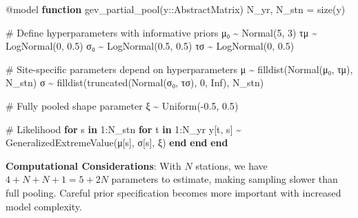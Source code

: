 \documentclass[
  letterpaper,
  DIV=11,
  numbers=noendperiod]{scrreprt}
\newenvironment{Shaded}{\begin{snugshade}}{\end{snugshade}}
\newcommand{\CommentTok}[1]{\textcolor[rgb]{0.37,0.37,0.37}{#1}}
\newcommand{\ConstantTok}[1]{\textcolor[rgb]{0.56,0.35,0.01}{#1}}
\newcommand{\ControlFlowTok}[1]{\textcolor[rgb]{0.00,0.23,0.31}{\textbf{#1}}}
\newcommand{\DataTypeTok}[1]{\textcolor[rgb]{0.68,0.00,0.00}{#1}}
\newcommand{\FloatTok}[1]{\textcolor[rgb]{0.68,0.00,0.00}{#1}}
\newcommand{\FunctionTok}[1]{\textcolor[rgb]{0.28,0.35,0.67}{#1}}
\newcommand{\KeywordTok}[1]{\textcolor[rgb]{0.00,0.23,0.31}{\textbf{#1}}}
\newcommand{\NormalTok}[1]{\textcolor[rgb]{0.00,0.23,0.31}{#1}}
\newcommand{\OperatorTok}[1]{\textcolor[rgb]{0.37,0.37,0.37}{#1}}
\newcommand{\PreprocessorTok}[1]{\textcolor[rgb]{0.68,0.00,0.00}{#1}}
\begin{document}
\begin{Shaded}
\begin{Highlighting}[]
\PreprocessorTok{@model} \KeywordTok{function} \FunctionTok{gev\_partial\_pool}\NormalTok{(y}\OperatorTok{::}\DataTypeTok{AbstractMatrix}\NormalTok{)}
\NormalTok{    N\_yr, N\_stn }\OperatorTok{=} \FunctionTok{size}\NormalTok{(y)}

    \CommentTok{\# Define hyperparameters with informative priors}
\NormalTok{    μ₀ }\OperatorTok{\textasciitilde{}} \FunctionTok{Normal}\NormalTok{(}\FloatTok{5}\NormalTok{, }\FloatTok{3}\NormalTok{)}
\NormalTok{    τμ }\OperatorTok{\textasciitilde{}} \FunctionTok{LogNormal}\NormalTok{(}\FloatTok{0}\NormalTok{, }\FloatTok{0.5}\NormalTok{)}
\NormalTok{    σ₀ }\OperatorTok{\textasciitilde{}} \FunctionTok{LogNormal}\NormalTok{(}\FloatTok{0.5}\NormalTok{, }\FloatTok{0.5}\NormalTok{)}
\NormalTok{    τσ }\OperatorTok{\textasciitilde{}} \FunctionTok{LogNormal}\NormalTok{(}\FloatTok{0}\NormalTok{, }\FloatTok{0.5}\NormalTok{)}

    \CommentTok{\# Site{-}specific parameters depend on hyperparameters}
\NormalTok{    μ }\OperatorTok{\textasciitilde{}} \FunctionTok{filldist}\NormalTok{(}\FunctionTok{Normal}\NormalTok{(μ₀, τμ), N\_stn)}
\NormalTok{    σ }\OperatorTok{\textasciitilde{}} \FunctionTok{filldist}\NormalTok{(}\FunctionTok{truncated}\NormalTok{(}\FunctionTok{Normal}\NormalTok{(σ₀, τσ), }\FloatTok{0}\NormalTok{, }\ConstantTok{Inf}\NormalTok{), N\_stn)}

    \CommentTok{\# Fully pooled shape parameter}
\NormalTok{    ξ }\OperatorTok{\textasciitilde{}} \FunctionTok{Uniform}\NormalTok{(}\OperatorTok{{-}}\FloatTok{0.5}\NormalTok{, }\FloatTok{0.5}\NormalTok{)}

    \CommentTok{\# Likelihood}
    \ControlFlowTok{for}\NormalTok{ s }\KeywordTok{in} \FloatTok{1}\OperatorTok{:}\NormalTok{N\_stn}
        \ControlFlowTok{for}\NormalTok{ t }\KeywordTok{in} \FloatTok{1}\OperatorTok{:}\NormalTok{N\_yr}
\NormalTok{            y[t, s] }\OperatorTok{\textasciitilde{}} \FunctionTok{GeneralizedExtremeValue}\NormalTok{(μ[s], σ[s], ξ)}
        \ControlFlowTok{end}
    \ControlFlowTok{end}
\KeywordTok{end}
\end{Highlighting}
\end{Shaded}

\textbf{Computational Considerations}: With \(N\) stations, we have
\(4 + N + N + 1 = 5 + 2N\) parameters to estimate, making sampling
slower than full pooling. Careful prior specification becomes more
important with increased model complexity.
\end{document}
